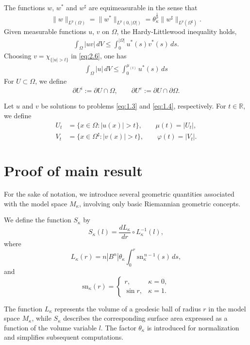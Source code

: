 \documentclass[11pt]{article}
\numberwithin{equation}{section}
\theoremstyle{definition}
\theoremstyle{remark}
\begin{document}
The functions $w$, $w^*$ and $w^\sharp$ are equimeasurable in the sense that
\begin{equation}\label{eq:2.8}
\|w\|_{L^p(\Omega)}
=
\|w^*\|_{L^p(0,|\Omega|)}
=
\theta_\kappa^{\frac{1}{p}}
\|w^\sharp\|_{L^p(\Omega^\sharp)}.
\end{equation}
Given measurable functions $u$, $v$ on $\Omega$, the Hardy-Littlewood inequality holds,
\begin{align}\label{eq:2.6}
  \int_{\Omega} |uv| \,dV \le \int_{0}^{|\Omega|} u^*(s)v^*(s) \,ds.
\end{align}
Choosing $v = \chi_{\{|u| > t \}} $ in \eqref{eq:2.6}, one has
\begin{align}
   \int_{\Omega} |u|\,dV \le \int_{0}^{\mu_(t)} u^*(s)\, ds
\end{align}
For $U\subset\Omega$, we define
\[
\partial U^i := \partial U \cap \Omega,
\qquad
\partial U^e := \partial U \cap \partial\Omega.
\]

Let $u$ and $v$ be solutions to problems \eqref{eq:1.3} and \eqref{eq:1.4}, respectively. For $t\in\mathbb{R}$, we define
\begin{align*}
U_t &= \{x\in\Omega: |u(x)|>t\}, \qquad \mu(t)=|U_t|,\\
V_t &= \{x\in\Omega^\sharp: |v(x)|>t\}, \qquad  \varphi(t)=|V_t|.
\end{align*}
\section{Proof of main result}
For the sake of notation, we introduce several geometric quantities associated with the model space $M_\kappa$, involving only basic Riemannian geometric concepts.

We define the function $S_\kappa$ by
\[
S_\kappa(l)
=
\frac{dL_\kappa}{dr}\circ L_\kappa^{-1}(l),
\]
where
\[
L_\kappa(r)
=
n|B^n|\theta_\kappa
\int_0^r \mathrm{sn}_\kappa^{\,n-1}(s)\,ds,
\]
and
\[
\mathrm{sn}_\kappa(r)=
\begin{cases}
r, & \kappa=0,\\
\sin r, & \kappa=1.
\end{cases}
\]

The function $L_\kappa$ represents the volume of a geodesic ball of radius $r$ in the model space $M_\kappa$, while $S_\kappa$ describes the corresponding surface area expressed as a function of the volume variable $l$. The factor $\theta_\kappa$ is introduced for normalization and simplifies subsequent computations.
\end{document}
